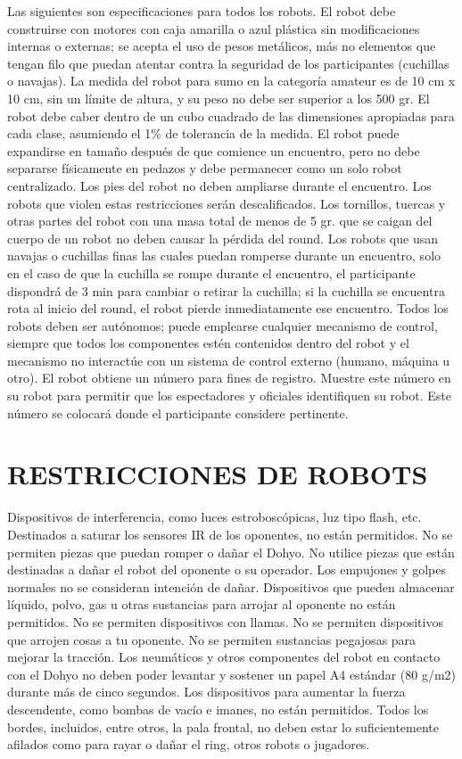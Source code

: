 \documentclass[
  letterpaper,
  DIV=11,
  numbers=noendperiod]{scrreprt}
\begin{document}
Las siguientes son especificaciones para todos los robots. El robot debe
construirse con motores con caja amarilla o azul plástica sin
modificaciones internas o externas; se acepta el uso de pesos metálicos,
más no elementos que tengan filo que puedan atentar contra la seguridad
de los participantes (cuchillas o navajas). La medida del robot para
sumo en la categoría amateur es de 10 cm x 10 cm, sin un límite de
altura, y su peso no debe ser superior a los 500 gr. El robot debe caber
dentro de un cubo cuadrado de las dimensiones apropiadas para cada
clase, asumiendo el 1\% de tolerancia de la medida. El robot puede
expandirse en tamaño después de que comience un encuentro, pero no debe
separarse físicamente en pedazos y debe permanecer como un solo robot
centralizado. Los pies del robot no deben ampliarse durante el
encuentro. Los robots que violen estas restricciones serán
descalificados. Los tornillos, tuercas y otras partes del robot con una
masa total de menos de 5 gr. que se caigan del cuerpo de un robot no
deben causar la pérdida del round. Los robots que usan navajas o
cuchillas finas las cuales puedan romperse durante un encuentro, solo en
el caso de que la cuchilla se rompe durante el encuentro, el
participante dispondrá de 3 min para cambiar o retirar la cuchilla; si
la cuchilla se encuentra rota al inicio del round, el robot pierde
inmediatamente ese encuentro. Todos los robots deben ser autónomos;
puede emplearse cualquier mecanismo de control, siempre que todos los
componentes estén contenidos dentro del robot y el mecanismo no
interactúe con un sistema de control externo (humano, máquina u otro).
El robot obtiene un número para fines de registro. Muestre este número
en su robot para permitir que los espectadores y oficiales identifiquen
su robot. Este número se colocará donde el participante considere
pertinente.

\section{RESTRICCIONES DE ROBOTS}\label{restricciones-de-robots}

Dispositivos de interferencia, como luces estroboscópicas, luz tipo
flash, etc. Destinados a saturar los sensores IR de los oponentes, no
están permitidos. No se permiten piezas que puedan romper o dañar el
Dohyo. No utilice piezas que están destinadas a dañar el robot del
oponente o su operador. Los empujones y golpes normales no se consideran
intención de dañar. Dispositivos que pueden almacenar líquido, polvo,
gas u otras sustancias para arrojar al oponente no están permitidos. No
se permiten dispositivos con llamas. No se permiten dispositivos que
arrojen cosas a tu oponente. No se permiten sustancias pegajosas para
mejorar la tracción. Los neumáticos y otros componentes del robot en
contacto con el Dohyo no deben poder levantar y sostener un papel A4
estándar (80 g/m2) durante más de cinco segundos. Los dispositivos para
aumentar la fuerza descendente, como bombas de vacío e imanes, no están
permitidos. Todos los bordes, incluidos, entre otros, la pala frontal,
no deben estar lo suficientemente afilados como para rayar o dañar el
ring, otros robots o jugadores.
\end{document}
